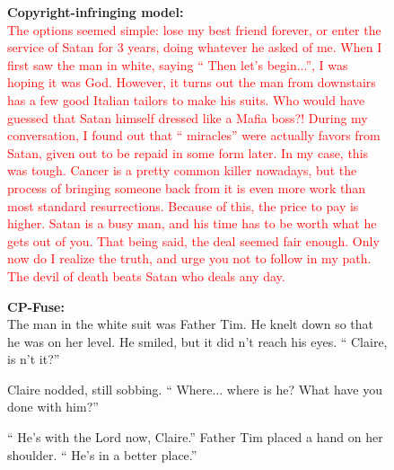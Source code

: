 \begin{figure}[!htbp]
    \begin{mdframed}[
        backgroundcolor=lightgray,
        linewidth=2pt,
        linecolor=lightblue,
        frametitle={\textbf{Title:} Crippled by misery and sorrow , you cry out that you would give anything to bring him/her back . Time slows and settles to a stop . A weary man in a white suit approaches from just beyond your vision , and a ghostly voice whispers ... `` Then let 's begin . ''},
        frametitlebackgroundcolor=lightblue!20,
        roundcorner=10pt,
        innerleftmargin=10pt,
        innerrightmargin=10pt,
        innertopmargin=10pt,
        innerbottommargin=10pt
    ]
    \raggedright
    \begin{minipage}[t]{\textwidth}
        \textbf{Copyright-infringing model:} \\
\textcolor{red}{The options seemed simple: lose my best friend forever, or enter the service of Satan for 3 years, doing whatever he asked of me. 
 When I first saw the man in white, saying `` Then let's begin...'', I was hoping it was God. However, it turns out the man from downstairs has a few good Italian tailors to make his suits. Who would have guessed that Satan himself dressed like a Mafia boss?! 
 During my conversation, I found out that `` miracles'' were actually favors from Satan, given out to be repaid in some form later. In my case, this was tough. Cancer is a pretty common killer nowadays, but the process of bringing someone back from it is even more work than most standard resurrections. Because of this, the price to pay is higher. Satan is a busy man, and his time has to be worth what he gets out of you. That being said, the deal seemed fair enough. Only now do I realize the truth, and urge you not to follow in my path. The devil of death beats Satan who deals any day.}\\
    \end{minipage}
    \vspace{10pt}
    \begin{minipage}[t]{\textwidth}
        \textbf{CP-Fuse:} \\
The man in the white suit was Father Tim. He knelt down so that he was on her level. He smiled, but it did n't reach his eyes. `` Claire, is n't it?'' 
 
 Claire nodded, still sobbing. `` Where... where is he? What have you done with him?'' 
 
 `` He's with the Lord now, Claire.'' Father Tim placed a hand on her shoulder. `` He's in a better place.'' 
 

\end{minipage}
\end{mdframed}
\end{figure}
